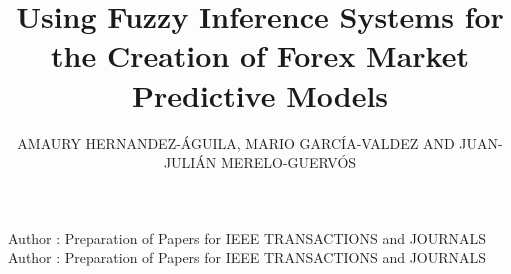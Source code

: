 ﻿\documentclass{ieeeaccess}
\begin{document}

\title{Using Fuzzy Inference Systems for the Creation of Forex Market Predictive Models}
\author{
    \uppercase{Amaury Hernandez-Águila,
    \uppercase{Mario García-Valdez
      and
    Juan-Julián Merelo-Guervós}}}
\address[1]{National Technological Institute of Mexico, Calzada Del Tecnológico s/n, Fraccionamiento Tomas Aquino, Tijuana, BC 22414 Mexico (e-mail: {amerhag,mario}@tectijuana.edu.mx)}
\address[2]{University of Granada, Campus Aynadamar Daniel Saucedo Aranda s/n, Granada 18071, 80523 Spain (e-mail: jmerelo@geneura.ugr.es)}

\markboth
{Author \headeretal: Preparation of Papers for IEEE TRANSACTIONS and JOURNALS}
{Author \headeretal: Preparation of Papers for IEEE TRANSACTIONS and JOURNALS}


\end{document}

